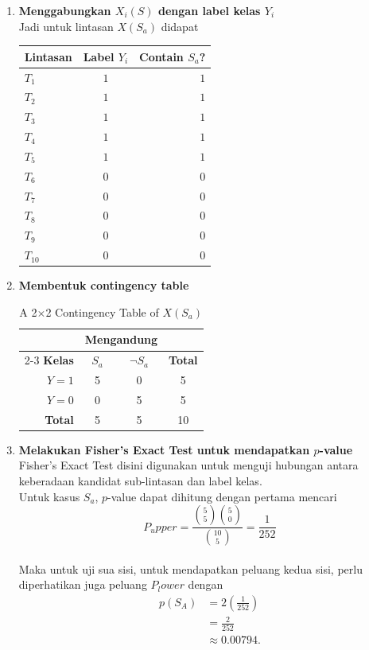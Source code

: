 \documentclass[a4paper,twoside]{article}
\begin{document}
\begin{enumerate}
	\item \textbf{Menggabungkan $X_i(S)$ dengan label kelas $Y_i$} \\
	Jadi untuk lintasan $X(S_a)$ didapat \\
	\begin{tabular}{l|c|r}
		\textbf{Lintasan} & \textbf{Label $Y_i$} & \textbf{Contain $S_a$?} \\
		\midrule
		$T_1$ & $1$ & $1$ \\
		$T_2$ & $1$ & $1$ \\
		$T_3$ & $1$ & $1$ \\
		$T_4$ & $1$ & $1$ \\
		$T_5$ & $1$ & $1$ \\
		$T_6$ & $0$ & $0$ \\
		$T_7$ & $0$ & $0$ \\
		$T_8$ & $0$ & $0$ \\
		$T_9$ & $0$ & $0$ \\
		$T_{10}$ & $0$ & $0$ \\
	\end{tabular}
	\item \textbf{Membentuk contingency table} \\
	\begin{table}[ht]
		\centering
		\caption{A 2$\times$2 Contingency Table of $X(S_a)$}
		\label{tab:contingency_testCase}
		\begin{tabular}{rccc}
			\toprule
			& \multicolumn{2}{c}{\textbf{Mengandung}} & \\
			\cmidrule(lr){2-3}
			\textbf{Kelas} & $S_a$ & $\neg S_a$ & \textbf{Total} \\
			\midrule
			$Y = 1$ & 5 & 0 & 5 \\
			$Y = 0$ & 0 & 5 & 5 \\
			\midrule
			\textbf{Total} & 5 & 5 & 10 \\
			\bottomrule
		\end{tabular}
	\end{table}
	\item \textbf{Melakukan Fisher's Exact Test untuk mendapatkan $p$-value} \\
	Fisher's Exact Test disini digunakan untuk menguji hubungan antara keberadaan kandidat sub-lintasan dan label kelas. \\
	Untuk kasus $S_a$, $p$-value dapat dihitung dengan pertama mencari  \[ P_upper = \frac{\binom{5}{5}\binom{5}{0}}{\binom{10}{5}} = \frac{1}{252} \] \\
	Maka untuk uji sua sisi, untuk mendapatkan peluang kedua sisi, perlu diperhatikan juga peluang $P_lower$ dengan \[ \begin{aligned} p(S_A) &=2\left(\frac{1}{252}\right)\\ &=\frac{2}{252}\\ &\approx 0.00794. \end{aligned} \]

\end{enumerate}
\end{document}
